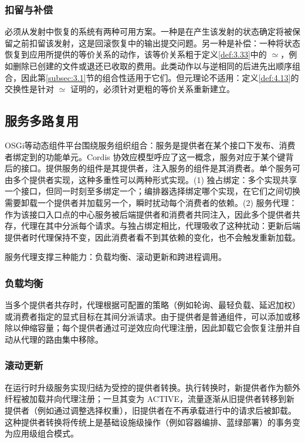 \subsubsection{扣留与补偿}

必须从发射中恢复的系统有两种可用方案。一种是在产生该发射的状态确定将被保留之前扣留该发射，这是回滚恢复中的输出提交问题\cite{ref48}。另一种是补偿\cite{ref49}：一种将状态恢复到应用所提供的等价关系的动作，该等价关系粗于定义\ref{def:3.33}中的 $\simeq$，例如删除已创建的文件或退还已收取的费用。此类动作以与逆相同的后进先出顺序组合，因此第\ref{subsec:3.1}节的组合性适用于它们。但元理论不适用：定义\ref{def:4.13}的交换性是针对 $\simeq$ 证明的，必须针对更粗的等价关系重新建立。

\subsection{服务多路复用}\label{sec:6.2}

OSGi\cite{ref50}等动态组件平台围绕服务组织组合：服务是提供者在某个接口下发布、消费者绑定到的功能单元。Cordis 协效应模型呼应了这一概念，服务对应于某个键背后的接口。提供服务的组件是其提供者，注入服务的组件是其消费者。单个服务可由多个提供者实现，这种多重性可以两种形式实现。(1) 独占绑定：多个实现共享一个接口，但同一时刻至多绑定一个；编排器选择绑定哪个实现，在它们之间切换需要卸载一个提供者并加载另一个，瞬时扰动每个消费者的依赖。(2) 服务代理：作为该接口入口点的中心服务被后端提供者和消费者共同注入，因此多个提供者共存，代理在其中分派每个请求。与独占绑定相比，代理吸收了这种扰动：更新后端提供者时代理保持不变，因此消费者看不到其依赖的变化，也不会触发重新加载。

服务代理支撑三种能力：负载均衡、滚动更新和跨进程调用。

\subsubsection{负载均衡}

当多个提供者共存时，代理根据可配置的策略（例如轮询、最轻负载、延迟加权）或消费者指定的显式目标在其间分派请求。由于提供者是普通组件，可以添加或移除以伸缩容量；每个提供者通过可逆效应向代理注册，因此卸载它会恢复注册并自动从代理的路由集中移除。

\subsubsection{滚动更新}

在运行时升级服务实现归结为受控的提供者转换\cite{ref51,ref52}。执行转换时，新提供者作为额外纤程被加载并向代理注册；一旦其变为 ACTIVE，流量逐渐从旧提供者转移到新提供者（例如通过调整选择权重），旧提供者在不再承载进行中的请求后被卸载。这种提供者转换将传统上是基础设施级操作（例如容器编排、蓝绿部署）的事务变为应用级组合模式。

